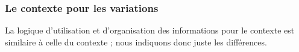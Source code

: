 \documentclass[10pt, a4paper]{article}
\begin{document}

\subsubsection{Le contexte  pour les variations}

La logique d'utilisation et d'organisation des informations pour le contexte  est similaire à celle du contexte  ; nous indiquons donc juste les différences.
%
\end{document}
